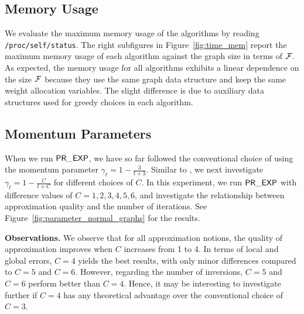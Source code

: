 



\subsection{Memory Usage}

We evaluate the maximum memory usage of the algorithms by reading \texttt{/proc/self/status}. 
The right subfigures in Figure~\ref{fig:time_mem} report the maximum memory usage of each algorithm
against the graph size in terms of $\mathcal {F}$.
As expected, the memory usage for all algorithms exhibits a linear dependence on the size $\mathcal {F}$ because they use the same graph data structure and keep the same weight allocation variables. The slight difference is due to auxiliary data structures used for greedy choices in each algorithm.


\subsection{Momentum Parameters}
When we run $\mathsf{PR\_EXP}$, 
we have so far followed the conventional choice of using
the momentum parameter
 $\gamma_t = 1 - \frac{3}{t+3}$.
Similar to \cite{DBLP:conf/nips/HarbQC22}, 
we next investigate $\gamma_t = 1 - \frac{C}{t+C}$
for different choices of $C$. In this experiment, we run $\mathsf{PR\_EXP}$ with difference values of $C= 1, 2, 3, 4, 5, 6$, and investigate the relationship between approximation quality and the number of iterations. See Figure~\ref{fig:parameter_normal_graphs} for the results. 


\noindent \textbf{Observations.} We observe that for
all approximation notions, the quality of approximation
improves when $C$ increases from 1 to 4.
In terms of local and global errors, $C = 4$ yields the best results, with only minor differences compared to $C = 5$ and $C = 6$. However, regarding the number of inversions, $C = 5$ and $C = 6$ perform better than $C = 4$.  Hence, it may be interesting to investigate further
if $C=4$ has any theoretical advantage over the conventional choice of $C=3$.






